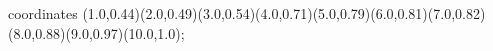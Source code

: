 					coordinates { (1.0,0.44)(2.0,0.49)(3.0,0.54)(4.0,0.71)(5.0,0.79)(6.0,0.81)(7.0,0.82)(8.0,0.88)(9.0,0.97)(10.0,1.0)};